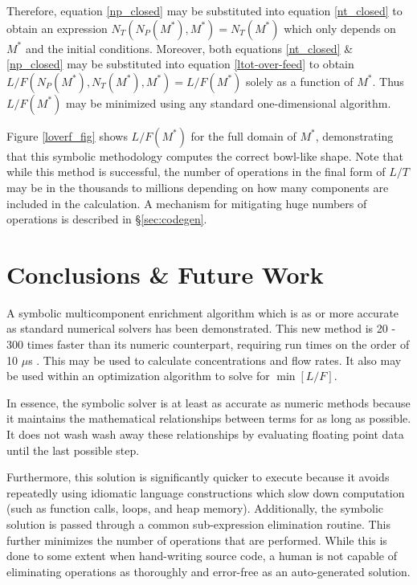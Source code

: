 \documentclass{ansconf}
\newcommand{\us}[0]{$\mu$s }
\begin{document}
Therefore, equation \ref{np_closed} may be substituted into equation \ref{nt_closed}
to obtain an expression $N_T(N_P(M^*),M^*)=N_T(M^*)$ which only depends on $M^*$ and 
the initial conditions.  Moreover, both equations \ref{nt_closed} \& \ref{np_closed}
may be substituted into equation \ref{ltot-over-feed} to obtain 
$L/F(N_P(M^*),N_T(M^*),M^*)=L/F(M^*)$ solely as a function of $M^*$.  Thus
$L/F(M^*)$ may be minimized using any standard one-dimensional algorithm.

Figure \ref{loverf_fig} shows $L/F(M^*)$ for the full domain of $M^*$, demonstrating 
that this symbolic methodology computes the correct bowl-like shape.  Note that while 
this method is successful, the number of operations in the final form of $L/T$ may be 
in the thousands to millions depending on how many components are included in the 
calculation.  A mechanism for mitigating huge numbers of operations is described
in \S \ref{sec:codegen}.


\section{Conclusions \& Future Work}
\label{sec:conc}

A symbolic multicomponent enrichment algorithm which is as or more accurate as 
standard numerical solvers has been demonstrated.  This new method is 20 - 300
times faster than its numeric counterpart, requiring run times on the order of 10 \us.
This may be used to calculate concentrations and flow rates.  It also may be used 
within an optimization algorithm to solve for $\min\left[L/F\right]$.

In essence, the symbolic solver is at least as accurate as numeric methods because
it maintains the mathematical relationships between terms for as long as possible.
It does not wash wash away these relationships by evaluating floating point data
until the last possible step.

Furthermore, this solution is significantly quicker to execute because it avoids
repeatedly using idiomatic language constructions which slow down computation (such
as function calls, loops, and heap memory).  Additionally, the symbolic solution is
passed through a common sub-expression elimination routine.  This further minimizes
the number of operations that are performed.  While this is done to some extent when 
hand-writing source code, a human is not capable of eliminating operations as 
thoroughly and error-free as an auto-generated solution.
\end{document}
